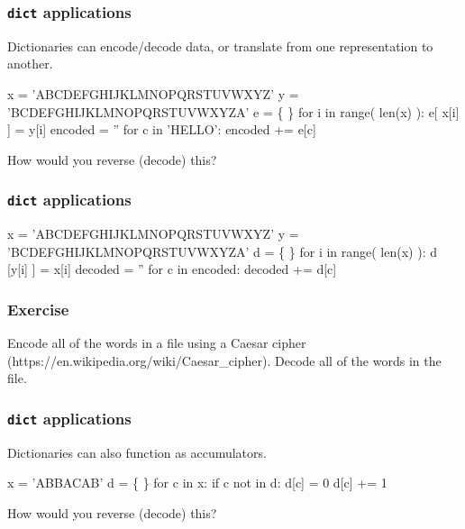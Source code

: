 \documentclass[11pt]{beamer}
\begin{document}
\begin{frame}[fragile]
  \frametitle{\texttt{dict} applications}
  \Enlarge

  \begin{itemize}
  \myitem  Dictionaries can encode/decode data, or translate from one representation to another.
  \end{itemize} %
  \begin{semiverbatim}
x = 'ABCDEFGHIJKLMNOPQRSTUVWXYZ'
y = 'BCDEFGHIJKLMNOPQRSTUVWXYZA'
e = \{ \}
for i in range( len(x) ):
    e[ x[i] ] = y[i]
encoded = ''
for c in 'HELLO':
    encoded += e[c]
  \end{semiverbatim}
  \begin{itemize}
  \myitem  How would you reverse (decode) this?
  \end{itemize}
\end{frame}

\begin{frame}[fragile]
  \frametitle{\texttt{dict} applications}
  \Enlarge

  \begin{semiverbatim}
x = 'ABCDEFGHIJKLMNOPQRSTUVWXYZ'
y = 'BCDEFGHIJKLMNOPQRSTUVWXYZA'
d = \{ \}
for i in range( len(x) ):
    d [y[i] ] = x[i]
decoded = ''
for c in encoded:
    decoded += d[c]
  \end{semiverbatim}
\end{frame}

\begin{frame}[fragile]
  \frametitle{Exercise}
  \Enlarge

  \begin{itemize}
  \myitem  Encode all of the words in a file using a Caesar cipher (https://en.wikipedia.org/wiki/Caesar\_cipher).
  \myitem  Decode all of the words in the file.
  \end{itemize}
\end{frame}

\begin{frame}[fragile]
  \frametitle{\texttt{dict} applications}
  \Enlarge

  \begin{itemize}
  \myitem  Dictionaries can also function as accumulators.
  \end{itemize}
  \begin{semiverbatim}
x = 'ABBACAB'
d = \{ \}
for c in x:
    if c not in d:
        d[c] = 0
    d[c] += 1
  \end{semiverbatim}
  \begin{itemize}
  \myitem  How would you reverse (decode) this?
  \end{itemize}
\end{frame}
\end{document}
